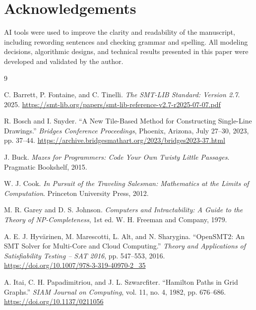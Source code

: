 \documentclass[letterpaper,11pt]{article}
\begin{document}
\section*{Acknowledgements}

AI tools were used to improve the clarity and readability of the
manuscript, including rewording sentences and checking grammar and
spelling. All modeling decisions, algorithmic designs, and technical
results presented in this paper were developed and validated by the
author.


{\setlength{\baselineskip}{13pt}
  \raggedright

  \begin{thebibliography}{9}


   C. Barrett, P. Fontaine, and
    C. Tinelli. \textit{The SMT-LIB Standard: Version
      2.7}. 2025. \url{https://smt-lib.org/papers/smt-lib-reference-v2.7-r2025-07-07.pdf}

   R. Bosch and
    I. Snyder. ``A New Tile-Based Method for Constructing Single-Line
    Drawings.''  \textit{Bridges Conference Proceedings}, Phoenix,
    Arizona, July 27--30, 2023, pp. 37--44.
    \url{https://archive.bridgesmathart.org/2023/bridges2023-37.html}

   J. Buck. \textit{Mazes for
    Programmers: Code Your Own Twisty Little Passages}. Pragmatic
    Bookshelf, 2015.

   W. J. Cook. \textit{In Pursuit of the
    Traveling Salesman: Mathematics at the Limits of Computation}.
    Princeton University Press, 2012.

   M. R. Garey and
    D. S. Johnson. \textit{Computers and Intractability: A Guide to
      the Theory of NP-Completeness}, 1st ed. W. H. Freeman and
    Company, 1979.

   A. E. J. Hyv{\"a}rinen, M. Marescotti, L. Alt,
    and N. Sharygina.  ``OpenSMT2: An SMT Solver for Multi-Core and
    Cloud Computing.''  \textit{Theory and Applications of
      Satisfiability Testing -- SAT 2016}, pp. 547--553, 2016.
    \url{https://doi.org/10.1007/978-3-319-40970-2_35}

   A. Itai, C. H. Papadimitriou, and
    J. L. Szwarcfiter. ``Hamilton Paths in Grid Graphs.''
    \textit{SIAM Journal on Computing}, vol. 11, no. 4, 1982,
    pp. 676--686.  \url{https://doi.org/10.1137/0211056}


\end{thebibliography}}
\end{document}
